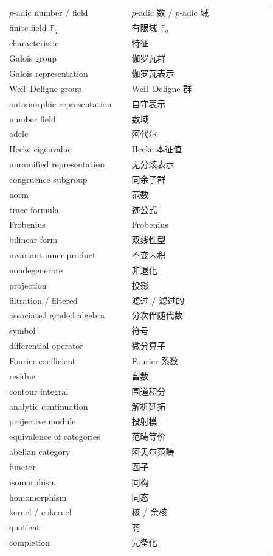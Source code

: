 \begin{longtable}{p{0.40\linewidth}p{0.28\linewidth}p{0.18\linewidth}}
$p$-adic number / field & $p$-adic 数 / $p$-adic 域 &  \\
finite field $\mathbb{F}_q$ & 有限域 $\mathbb{F}_q$ &  \\
characteristic & 特征 &  \\
Galois group & 伽罗瓦群 &  \\
Galois representation & 伽罗瓦表示 &  \\
Weil–Deligne group & Weil–Deligne 群 &  \\
automorphic representation & 自守表示 &  \\
number field & 数域 &  \\
adele & 阿代尔 &  \\
Hecke eigenvalue & Hecke 本征值 &  \\
unramified representation & 无分歧表示 &  \\
congruence subgroup & 同余子群 &  \\
norm & 范数 &  \\
trace formula & 迹公式 &  \\
Frobenius & Frobenius &  \\
bilinear form & 双线性型 &  \\
invariant inner product & 不变内积 &  \\
nondegenerate & 非退化 &  \\
projection & 投影 &  \\
filtration / filtered & 滤过 / 滤过的 &  \\
associated graded algebra & 分次伴随代数 &  \\
symbol & 符号 &  \\
differential operator & 微分算子 &  \\
Fourier coefficient & Fourier 系数 &  \\
residue & 留数 &  \\
contour integral & 围道积分 &  \\
analytic continuation & 解析延拓 &  \\
projective module & 投射模 &  \\
equivalence of categories & 范畴等价 &  \\
abelian category & 阿贝尔范畴 &  \\
functor & 函子 &  \\
isomorphism & 同构 &  \\
homomorphism & 同态 &  \\
kernel / cokernel & 核 / 余核 &  \\
quotient & 商 &  \\
completion & 完备化 &  \\

\end{longtable}
